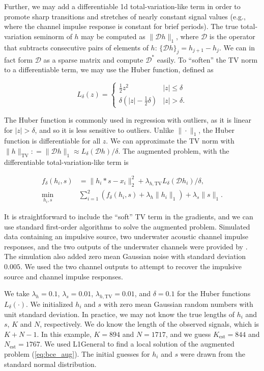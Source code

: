 \documentclass[journal]{IEEEtran}
\newcommand{\defeq}{\mathrel{\mathop:}=}
\begin{document}
\noindent Further, we may add a differentiable 1d total-variation-like term in order to promote sharp transitions and stretches of nearly constant signal values (e.g., where the channel impulse response is constant for brief periods).  The true total-variation seminorm of $h$ may be computed as $\|\mathcal{D}h\|_1$, where $\mathcal{D}$ is the operator that subtracts consecutive pairs of elements of $h$: $\{\mathcal{D}h\}_j = h_{j+1} - h_j$.  We can in fact form $\mathcal{D}$ as a sparse matrix and compute $\mathcal{D}^\ast$ easily.  To ``soften'' the TV norm to a differentiable term, we may use the Huber function, defined as

\[ L_\delta(z) = \left\{\begin{array}{ll} \frac{1}{2}z^2 & |z| \le \delta\\ \delta\left(|z| - \frac{1}{2}\delta\right) & |z| > \delta. \end{array}\right. \] 

\noindent The Huber function is commonly used in regression with outliers, as it is linear for $|z|>\delta$, and so it is less sensitive to outliers.  Unlike ${\|\cdot\|_1}$, the Huber function is differentiable for all $z$.  We can approximate the TV norm with ${\|h\|_\text{TV} \defeq\|\mathcal{D}h\|_1 \approx L_\delta(\mathcal{D}h)/\delta}$.  The augmented problem, with the differentiable total-variation-like term is

\begin{align}
   \label{eq:bce_aug}
   f_\delta(h_i,s) &= \|h_i\ast s - x_i\|_2^2 + \lambda_{h,\text{TV}}L_\delta(\mathcal{D}h_i)/\delta,\nonumber\\
   \min_{h_i,s} ~&\sum_{i=1}^2\left(f_\delta(h_i,s) + \lambda_h\|h_i\|_1\right) + \lambda_s\|s\|_1.
\end{align}

It is straightforward to include the ``soft'' TV term in the gradients, and we can use standard first-order algorithms to solve the augmented problem.  Simulated data containing an impulsive source, two underwater acoustic channel impulse responses, and the two outputs of the underwater channels were provided by \cite{rideout_2016}.  The simulation also added zero mean Gaussian noise with standard deviation $0.005$.  We used the two channel outputs to attempt to recover the impulsive source and channel impulse responses.

We take $\lambda_h = 0.1$, $\lambda_s=0.01$, $\lambda_{h,\text{TV}}=0.01$, and $\delta=0.1$ for the Huber functions $L_\delta(\cdot)$.  We initialized $h_i$ and $s$ with zero mean Gaussian random numbers with unit standard deviation.  In practice, we may not know the true lengths of $h_i$ and $s$, $K$ and $N$, respectively.  We do know the length of the observed signals, which is $K+N-1$.  In this example, $K=894$ and $N=1717$, and we guess $K_\text{est}=844$ and $N_\text{est}=1767$.  We used L1General \cite{schmidt_2010} to find a local solution of the augmented problem (\ref{eq:bce_aug}).  The initial guesses for $h_i$ and $s$ were drawn from the standard normal distribution.
\end{document}
